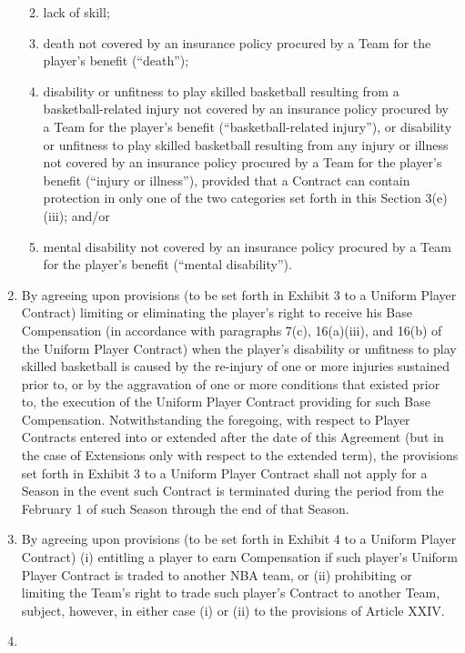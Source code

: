 \documentclass[
]{book}
\providecommand{\tightlist}{%
  \setlength{\itemsep}{0pt}\setlength{\parskip}{0pt}}
\begin{document}
\begin{enumerate}
  \begin{enumerate}
  \def\labelenumii{(\roman{enumii})}
  \tightlist
  \item
    lack of skill;
  \item
    death not covered by an insurance policy procured by a Team for the player's benefit (``death'');
  \item
    disability or unfitness to play skilled basketball resulting from a basketball-related injury not covered by an insurance policy procured by a Team for the player's benefit (``basketball-related injury''), or disability or unfitness to play skilled basketball resulting from any injury or illness not covered by an insurance policy procured by a Team for the player's benefit (``injury or illness''), provided that a Contract can contain protection in only one of the two categories set forth in this Section 3(e)(iii); and/or
  \item
    mental disability not covered by an insurance policy procured by a Team for the player's benefit (``mental disability'').
  \end{enumerate}
\item
  By agreeing upon provisions (to be set forth in Exhibit 3 to a Uniform Player Contract) limiting or eliminating the player's right to receive his Base Compensation (in accordance with paragraphs 7(c), 16(a)(iii), and 16(b) of the Uniform Player Contract) when the player's disability or unfitness to play skilled basketball is caused by the re-injury of one or more injuries sustained prior to, or by the aggravation of one or more conditions that existed prior to, the execution of the Uniform Player Contract providing for such Base Compensation. Notwithstanding the foregoing, with respect to Player Contracts entered into or extended after the date of this Agreement (but in the case of Extensions only with respect to the extended term), the provisions set forth in Exhibit 3 to a Uniform Player Contract shall not apply for a Season in the event such Contract is terminated during the period from the February 1 of such Season through the end of that Season.
\item
  By agreeing upon provisions (to be set forth in Exhibit 4 to a Uniform Player Contract) (i) entitling a player to earn Compensation if such player's Uniform Player Contract is traded to another NBA team, or (ii) prohibiting or limiting the Team's right to trade such player's Contract to another Team, subject, however, in either case (i) or (ii) to the provisions of Article XXIV.
\item

\end{enumerate}
\end{document}
